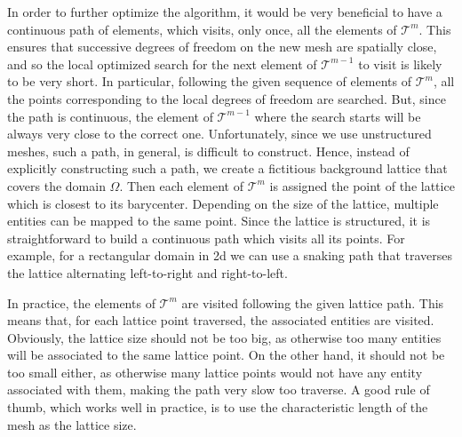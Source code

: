 In order to further optimize the algorithm, it would be very beneficial 
to have a continuous path of elements, which visits, only once, all the 
elements of $\mathcal{T}^m$. This ensures that successive degrees of freedom
on the new mesh are spatially close, and so the local optimized search for the
next element of $\mathcal{T}^{m-1}$ to visit is likely to be very short.
In particular, following the given sequence of elements of $\mathcal{T}^m$, 
all the points corresponding to the local degrees of freedom are searched. 
But, since the path is continuous, the element of $\mathcal{T}^{m-1}$ 
where the search starts will be always very close to the correct one.
Unfortunately, since we use unstructured meshes, such a path, in general,
is difficult to construct.
Hence, instead of explicitly constructing such a path, 
we create a fictitious background lattice that covers the domain $\Omega$. 
Then each element of $\mathcal{T}^m$ is assigned the point of the
lattice which is closest to its barycenter. Depending on the size of the
lattice, multiple entities can be mapped to the same point. Since the
lattice is structured, it is straightforward to build a continuous path which
visits all its points. For example, for a rectangular domain in 2d we can use 
a snaking path that traverses the lattice alternating left-to-right and 
right-to-left.

In practice, the elements of $\mathcal{T}^m$ are visited
following the given lattice path. This means that, 
for each lattice point traversed, the associated entities are visited. 
Obviously, the lattice size should not be too
big, as otherwise too many entities will be associated to the same lattice 
point. On the other hand, it should not be too small either, as otherwise
many lattice points would not have any entity associated with them, 
making the path very slow too traverse. 
A good rule of thumb, which works well in practice, 
is to use the characteristic length of the mesh as the lattice size.
